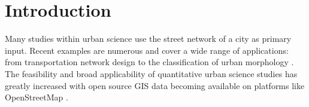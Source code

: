 \section{Introduction}
\label{sec:intro}


Many studies within urban science use the street network of a city as primary input. Recent examples are numerous and cover a wide range of applications: from transportation network design \cite{farahani_review_2013} to the classification of urban morphology \cite{fleischmann_methodological_2021}. The feasibility and broad applicability of quantitative urban science studies has greatly increased with open source GIS data becoming available on platforms like OpenStreetMap \cite{arcaute_recent_2021}. 
    

